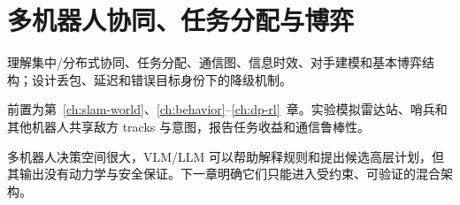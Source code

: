 \chapter{多机器人协同、任务分配与博弈}
\label{ch:multi-robot}

\begin{learningobjectives}
理解集中/分布式协同、任务分配、通信图、信息时效、对手建模和基本博弈结构；设计丢包、延迟和错误目标身份下的降级机制。
\end{learningobjectives}

\begin{prerequisites}
前置为第~\ref{ch:slam-world}、\ref{ch:behavior}--\ref{ch:dp-rl}~章。实验模拟雷达站、哨兵和其他机器人共享敌方 tracks 与意图，报告任务收益和通信鲁棒性。
\end{prerequisites}


\begin{chaptertransition}
多机器人决策空间很大，VLM/LLM 可以帮助解释规则和提出候选高层计划，但其输出没有动力学与安全保证。下一章明确它们只能进入受约束、可验证的混合架构。
\end{chaptertransition}

